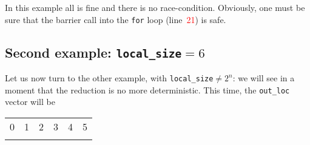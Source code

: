 \documentclass[a4paper,11pt]{article}
\newcommand{\row}[1]{line~\textcolor{red}{#1}}
\begin{document}
\noindent In this example all is fine and there is no race-condition. Obviously, one must be sure that
the barrier call into the \texttt{for} loop (\row{21}) is safe.

\subsection*{Second example: \texttt{local\_size}$=6$ }

Let us now turn to  the other example, with \texttt{local\_size}$\neq2^{n}$: we will see in a moment
that the reduction is no more deterministic. This time, the \texttt{out\_loc} vector will be

\begin{center}
\begin{tabular}{!{\vrule width 1.5pt}P*{5}{|P}!{\vrule width 1.5pt}}
0 & 1 & 2 & 3 & 4 & 5 \tabularnewline
{}
\end{tabular}
\end{center}
\end{document}
